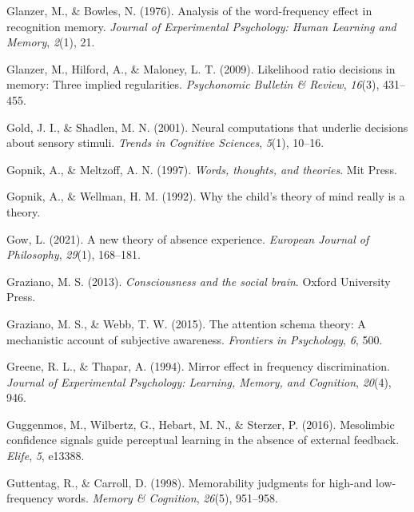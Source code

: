 \documentclass[12pt,twoside]{reedthesis}
\begin{document}
\leavevmode\hypertarget{ref-glanzer1976analysis}{}%
Glanzer, M., \& Bowles, N. (1976). Analysis of the word-frequency effect in recognition memory. \emph{Journal of Experimental Psychology: Human Learning and Memory}, \emph{2}(1), 21.

\leavevmode\hypertarget{ref-glanzer2009likelihood}{}%
Glanzer, M., Hilford, A., \& Maloney, L. T. (2009). Likelihood ratio decisions in memory: Three implied regularities. \emph{Psychonomic Bulletin \& Review}, \emph{16}(3), 431--455.

\leavevmode\hypertarget{ref-gold2001neural}{}%
Gold, J. I., \& Shadlen, M. N. (2001). Neural computations that underlie decisions about sensory stimuli. \emph{Trends in Cognitive Sciences}, \emph{5}(1), 10--16.

\leavevmode\hypertarget{ref-gopnik1997words}{}%
Gopnik, A., \& Meltzoff, A. N. (1997). \emph{Words, thoughts, and theories}. Mit Press.

\leavevmode\hypertarget{ref-gopnik1992child}{}%
Gopnik, A., \& Wellman, H. M. (1992). Why the child's theory of mind really is a theory.

\leavevmode\hypertarget{ref-gow2021new}{}%
Gow, L. (2021). A new theory of absence experience. \emph{European Journal of Philosophy}, \emph{29}(1), 168--181.

\leavevmode\hypertarget{ref-graziano2013consciousness}{}%
Graziano, M. S. (2013). \emph{Consciousness and the social brain}. Oxford University Press.

\leavevmode\hypertarget{ref-graziano2015attention}{}%
Graziano, M. S., \& Webb, T. W. (2015). The attention schema theory: A mechanistic account of subjective awareness. \emph{Frontiers in Psychology}, \emph{6}, 500.

\leavevmode\hypertarget{ref-greene1994mirror}{}%
Greene, R. L., \& Thapar, A. (1994). Mirror effect in frequency discrimination. \emph{Journal of Experimental Psychology: Learning, Memory, and Cognition}, \emph{20}(4), 946.

\leavevmode\hypertarget{ref-guggenmos2016mesolimbic}{}%
Guggenmos, M., Wilbertz, G., Hebart, M. N., \& Sterzer, P. (2016). Mesolimbic confidence signals guide perceptual learning in the absence of external feedback. \emph{Elife}, \emph{5}, e13388.

\leavevmode\hypertarget{ref-guttentag1998memorability}{}%
Guttentag, R., \& Carroll, D. (1998). Memorability judgments for high-and low-frequency words. \emph{Memory \& Cognition}, \emph{26}(5), 951--958.
\end{document}
